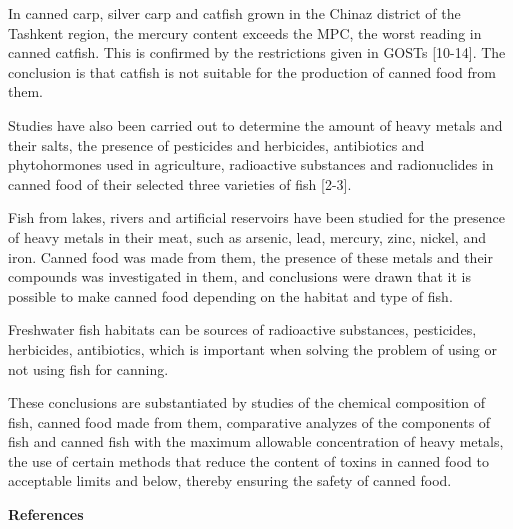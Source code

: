 \begin{multicols}{2}
In canned carp, silver carp and catfish grown in the Chinaz district of
the Tashkent region, the mercury content exceeds the MPC, the worst
reading in canned catfish. This is confirmed by the restrictions given
in GOSTs {[}10-14{]}. The conclusion is that catfish is not suitable for
the production of canned food from them.

Studies have also been carried out to determine the amount of heavy
metals and their salts, the presence of pesticides and herbicides,
antibiotics and phytohormones used in agriculture, radioactive
substances and radionuclides in canned food of their selected three
varieties of fish {[}2-3{]}.

Fish from lakes, rivers and artificial reservoirs have been studied for
the presence of heavy metals in their meat, such as arsenic, lead,
mercury, zinc, nickel, and iron. Canned food was made from them, the
presence of these metals and their compounds was investigated in them,
and conclusions were drawn that it is possible to make canned food
depending on the habitat and type of fish.

Freshwater fish habitats can be sources of radioactive substances,
pesticides, herbicides, antibiotics, which is important when solving the
problem of using or not using fish for canning.

These conclusions are substantiated by studies of the chemical
composition of fish, canned food made from them, comparative analyzes of
the components of fish and canned fish with the maximum allowable
concentration of heavy metals, the use of certain methods that reduce
the content of toxins in canned food to acceptable limits and below,
thereby ensuring the safety of canned food.
\end{multicols}

{\bfseries References}

